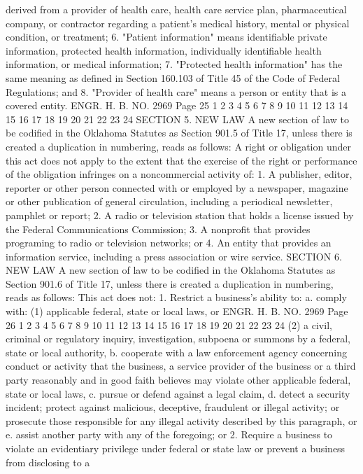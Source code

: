 derived from a provider of health care, health care service plan,
pharmaceutical company, or contractor regarding a patient's medical
history, mental or physical condition, or treatment;
6. "Patient information" means identifiable private
information, protected health information, individually identifiable
health information, or medical information;
7. "Protected health information" has the same meaning as
defined in Section 160.103 of Title 45 of the Code of Federal
Regulations; and
8. "Provider of health care" means a person or entity that is a
covered entity.
ENGR. H. B. NO. 2969 Page 25
1
2
3
4
5
6
7
8
9
10
11
12
13
14
15
16
17
18
19
20
21
22
23
24
SECTION 5. NEW LAW A new section of law to be codified
in the Oklahoma Statutes as Section 901.5 of Title 17, unless there
is created a duplication in numbering, reads as follows:
A right or obligation under this act does not apply to the
extent that the exercise of the right or performance of the
obligation infringes on a noncommercial activity of:
1. A publisher, editor, reporter or other person connected with
or employed by a newspaper, magazine or other publication of general
circulation, including a periodical newsletter, pamphlet or report;
2. A radio or television station that holds a license issued by
the Federal Communications Commission;
3. A nonprofit that provides programing to radio or television
networks; or
4. An entity that provides an information service, including a
press association or wire service.
SECTION 6. NEW LAW A new section of law to be codified
in the Oklahoma Statutes as Section 901.6 of Title 17, unless there
is created a duplication in numbering, reads as follows:
This act does not:
1. Restrict a business's ability to:
a. comply with:
(1) applicable federal, state or local laws, or
ENGR. H. B. NO. 2969 Page 26
1
2
3
4
5
6
7
8
9
10
11
12
13
14
15
16
17
18
19
20
21
22
23
24
(2) a civil, criminal or regulatory inquiry,
investigation, subpoena or summons by a federal,
state or local authority,
b. cooperate with a law enforcement agency concerning
conduct or activity that the business, a service
provider of the business or a third party reasonably
and in good faith believes may violate other
applicable federal, state or local laws,
c. pursue or defend against a legal claim,
d. detect a security incident; protect against malicious,
deceptive, fraudulent or illegal activity; or
prosecute those responsible for any illegal activity
described by this paragraph, or
e. assist another party with any of the foregoing; or
2. Require a business to violate an evidentiary privilege under
federal or state law or prevent a business from disclosing to a
